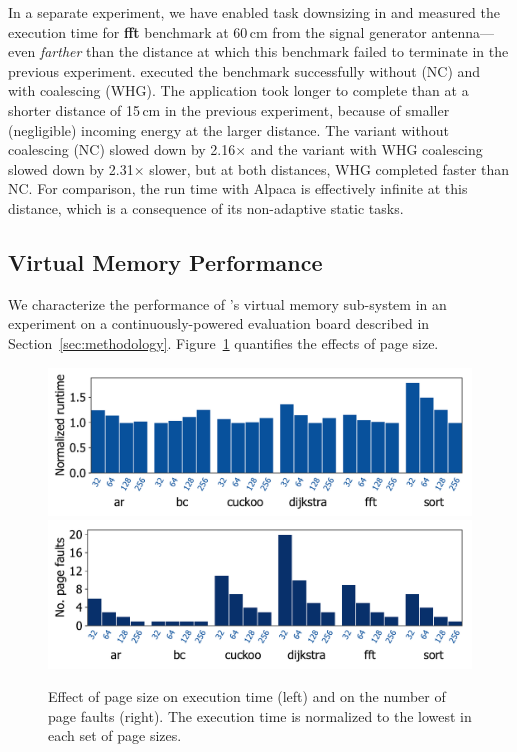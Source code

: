 In a separate experiment, we have enabled task downsizing in \sys and measured
the execution time for \textbf{fft} benchmark at 60\,cm from the signal
generator antenna---even \emph{farther} than the distance at which this
benchmark failed to terminate in the previous experiment. \sys executed the
benchmark successfully without (NC) and with coalescing (WHG). The application
took longer to complete than at a shorter distance of 15\,cm in the previous
experiment, because of smaller (negligible) incoming energy at the larger
distance. The variant without coalescing (NC) slowed down by 2.16$\times$ and the
variant with WHG coalescing slowed down by 2.31$\times$ slower, but at both
distances, WHG completed faster than NC.
%
For comparison, the run time with Alpaca is effectively infinite at this
distance, which is a consequence of its non-adaptive static tasks.

\subsection{Virtual Memory Performance}
\label{sec:results_memory_management}

We characterize the performance of \sys's virtual memory sub-system in an
experiment on a continuously-powered evaluation board described in
Section~\ref{sec:methodology}.  Figure~\ref{fig:page_size} quantifies the
effects of page size.


\begin{figure}
	\centering
	\includegraphics[width=\columnwidth]{figures/page_exec-time}
	\includegraphics[width=\columnwidth]{figures/pagePulls}
    \caption{Effect of page size on execution time (left) and on the number of
page faults (right). The execution time is normalized to the lowest in each set
of page sizes.}
	\label{fig:page_size}
\end{figure}



